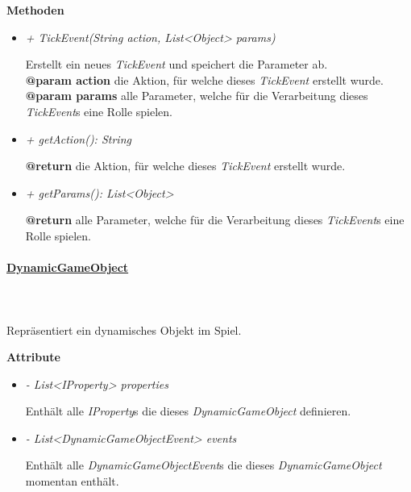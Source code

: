         \textbf{Methoden}
        \begin{itemize}
            \item \textit{+ TickEvent(String action, List<Object> params)}
                \begin{leftbar}[0.9\linewidth]
                    Erstellt ein neues \textit{TickEvent} und speichert die Parameter ab.\\
                    \textbf{@param action} die Aktion, für welche dieses \textit{TickEvent} erstellt wurde.\\
                    \textbf{@param params} alle Parameter, welche für die Verarbeitung dieses \textit{TickEvent}s eine Rolle spielen.
                \end{leftbar}
            \item \textit{+ getAction(): String}
                \begin{leftbar}[0.9\linewidth]
                    \textbf{@return} die Aktion, für welche dieses \textit{TickEvent} erstellt wurde.
                \end{leftbar}
            \item \textit{+ getParams(): List<Object>}
                \begin{leftbar}[0.9\linewidth]
                    \textbf{@return} alle Parameter, welche für die Verarbeitung dieses \textit{TickEvent}s eine Rolle spielen.
                \end{leftbar}
        \end{itemize}

        \paragraph{\underline{DynamicGameObject}} \mbox{}\\
        \\
            Repräsentiert ein dynamisches Objekt im Spiel.\par

            \textbf{Attribute}
            \begin{itemize}
                \item \textit{- List<IProperty> properties}
                    \begin{leftbar}[0.9\linewidth]
                        Enthält alle \textit{IProperty}s die dieses \textit{DynamicGameObject} definieren.
                    \end{leftbar}
                \item \textit{- List<DynamicGameObjectEvent> events}
                    \begin{leftbar}[0.9\linewidth]
                        Enthält alle \textit{DynamicGameObjectEvent}s die dieses \textit{DynamicGameObject} momentan enthält.
                    \end{leftbar}
            \end{itemize}

